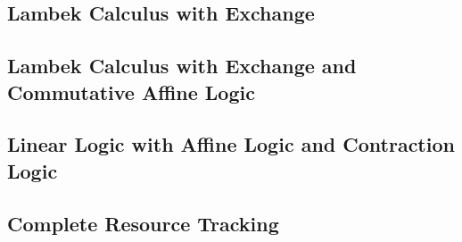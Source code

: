 \subsection{Lambek Calculus with Exchange}
\label{subsec:lambek_calculus_with_exchange}


\subsection{Lambek Calculus with Exchange and Commutative Affine Logic}
\label{subsec:linear_logic_with_affine_logic}


\subsection{Linear Logic with Affine Logic and Contraction Logic}
\label{subsec:linear_logic_with_affine_logic_and_contraction_logic}


\subsection{Complete Resource Tracking}
\label{subsec:complete_resource_tracking}


